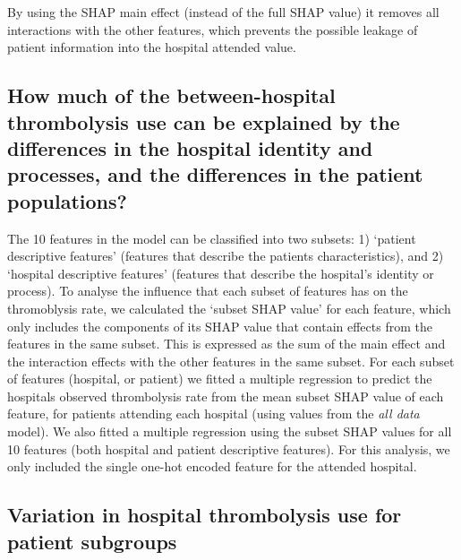 By using the SHAP main effect (instead of the full SHAP value) it removes all interactions with the other features, which prevents the possible leakage of patient information into the hospital attended value.


\subsection{How much of the between-hospital thrombolysis use can be explained by the differences in the hospital identity and processes, and the differences in the patient populations?}


The 10 features in the model can be classified into two subsets: 1) `patient descriptive features' (features that describe the patients characteristics), and 2) `hospital descriptive features' (features that describe the hospital’s identity or process). To analyse the influence that each subset of features has on the thromoblysis rate, we calculated the `subset SHAP value' for each feature, which only includes the components of its SHAP value that contain effects from the features in the same subset. This is expressed as the sum of the main effect and the interaction effects with the other features in the same subset. For each subset of features (hospital, or patient) we fitted a multiple regression to predict the hospitals observed thrombolysis rate from the mean subset SHAP value of each feature, for patients attending each hospital (using values from the \emph{all data} model). We also fitted a multiple regression using the subset SHAP values for all 10 features (both hospital and patient descriptive features). For this analysis, we only included the single one-hot encoded feature for the attended hospital. 


\subsection{Variation in hospital thrombolysis use for patient subgroups}

